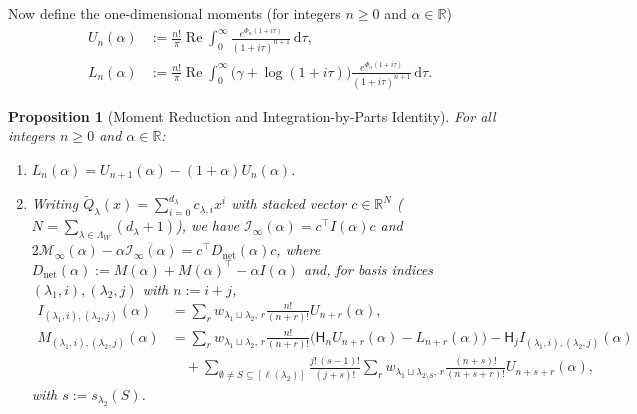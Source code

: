 \documentclass[11pt, reqno]{amsart}
\newtheorem{proposition}[lemma]{Proposition}
\theoremstyle{remark}
\numberwithin{equation}{section}
\DeclareMathOperator{\re}{Re}
\newcommand{\Harm}{\mathsf{H}}
\newcommand{\R}{\mathbb{R}}
\newcommand{\dd}{\,\mathrm{d}}
\begin{document}
Now define the one-dimensional moments (for integers $n \ge 0$ and $\alpha \in \R$)
\begin{align}
U_n(\alpha) &:= \frac{n!}{\pi}\re \int_0^\infty \frac{e^{\Phi_\alpha(1+i\tau)}}{(1+i\tau)^{n+1}}\dd\tau, \nonumber\\
L_n(\alpha) &:= \frac{n!}{\pi}\re \int_0^\infty \bigl(\gamma + \log(1+i\tau)\bigr)\frac{e^{\Phi_\alpha(1+i\tau)}}{(1+i\tau)^{n+1}}\dd\tau. \label{eq:Un-Ln-def}
\end{align}

\begin{proposition}[Moment Reduction and Integration-by-Parts Identity]\label{prop:UL-reduction}
For all integers $n \ge 0$ and $\alpha \in \R$:
\begin{enumerate}
\item[(i)] $L_n(\alpha) = U_{n+1}(\alpha) - (1+\alpha) U_n(\alpha)$.
\item[(ii)] Writing $\widetilde{Q}_\lambda(x) = \sum_{i=0}^{d_\lambda} c_{\lambda, i} x^i$ with
stacked vector $c \in \R^N$ ($N = \sum_{\lambda\in\Lambda_W}(d_\lambda + 1)$), we have
$\mathcal{I}_\infty(\alpha) = c^\top I(\alpha) c$ and
$2\mathcal{M}_\infty(\alpha) - \alpha \mathcal{I}_\infty(\alpha) = c^\top D_{\mathrm{net}}(\alpha) c$,
where $D_{\mathrm{net}}(\alpha) := M(\alpha) + M(\alpha)^\top - \alpha I(\alpha)$ and, for basis
indices $(\lambda_1, i), (\lambda_2, j)$ with $n := i+j$,
\begin{align}
I_{(\lambda_1,i),(\lambda_2,j)}(\alpha)
&= \sum_r w_{\lambda_1\sqcup\lambda_2,\, r} \frac{n!}{(n+r)!} U_{n+r}(\alpha), \label{eq:I-entry}\\
M_{(\lambda_1,i),(\lambda_2,j)}(\alpha)
&= \sum_r w_{\lambda_1\sqcup\lambda_2,\, r} \frac{n!}{(n+r)!}
\bigl(\Harm_n U_{n+r}(\alpha) - L_{n+r}(\alpha)\bigr)
- \Harm_j I_{(\lambda_1,i),(\lambda_2,j)}(\alpha) \nonumber\\
&\quad + \sum_{\emptyset \neq S \subseteq [\ell(\lambda_2)]}
\frac{j!\,(s-1)!}{(j+s)!}
\sum_r w_{\lambda_1\sqcup\lambda_{2\setminus S},\, r}
\frac{(n+s)!}{(n+s+r)!} U_{n+s+r}(\alpha), \label{eq:M-entry}
\end{align}
with $s := s_{\lambda_2}(S)$.
\end{enumerate}
\end{proposition}
\end{document}
